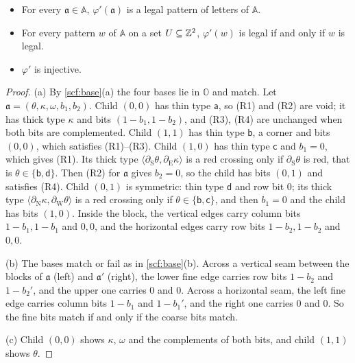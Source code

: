 \begin{lemma}\label{scf:ruler-forward}
\begin{itemize}
\item[(a)] For every $\mathfrak a\in\mathbb A$, $\varphi'(\mathfrak a)$ is a legal pattern of letters of $\mathbb A$.
\item[(b)] For every pattern $w$ of $\mathbb A$ on a set $U\subseteq\mathbb{Z}^2$, $\varphi'(w)$ is legal if and only if $w$ is legal.
\item[(c)] $\varphi'$ is injective.
\end{itemize}
\end{lemma}

\begin{proof}
(a) By \cref{scf:base}(a) the four bases lie in $\mathbb O$ and match. Let $\mathfrak a=(\theta,\kappa,\omega,b_1,b_2)$. Child $(0,0)$ has thin type $\mathsf a$, so (R1) and (R2) are void; it has thick type $\kappa$ and bits $(1-b_1,1-b_2)$, and (R3), (R4) are unchanged when both bits are complemented. Child $(1,1)$ has thin type $\mathsf b$, a corner and bits $(0,0)$, which satisfies (R1)--(R3). Child $(1,0)$ has thin type $\mathsf c$ and $b_1=0$, which gives (R1). Its thick type $\langle\partial_{\mathrm S}\theta,\partial_{\mathrm E}\kappa\rangle$ is a red crossing only if $\partial_{\mathrm S}\theta$ is red, that is $\theta\in\{\mathsf b,\mathsf d\}$. Then (R2) for $\mathfrak a$ gives $b_2=0$, so the child has bits $(0,1)$ and satisfies (R4). Child $(0,1)$ is symmetric: thin type $\mathsf d$ and row bit $0$; its thick type $\langle\partial_{\mathrm N}\kappa,\partial_{\mathrm W}\theta\rangle$ is a red crossing only if $\theta\in\{\mathsf b,\mathsf c\}$, and then $b_1=0$ and the child has bits $(1,0)$. Inside the block, the vertical edges carry column bits $1-b_1,1-b_1$ and $0,0$, and the horizontal edges carry row bits $1-b_2,1-b_2$ and $0,0$.

(b) The bases match or fail as in \cref{scf:base}(b). Across a vertical seam between the blocks of $\mathfrak a$ (left) and $\mathfrak a'$ (right), the lower fine edge carries row bits $1-b_2$ and $1-b_2'$, and the upper one carries $0$ and $0$. Across a horizontal seam, the left fine edge carries column bits $1-b_1$ and $1-b_1'$, and the right one carries $0$ and $0$. So the fine bits match if and only if the coarse bits match.

(c) Child $(0,0)$ shows $\kappa$, $\omega$ and the complements of both bits, and child $(1,1)$ shows $\theta$.
\end{proof}

